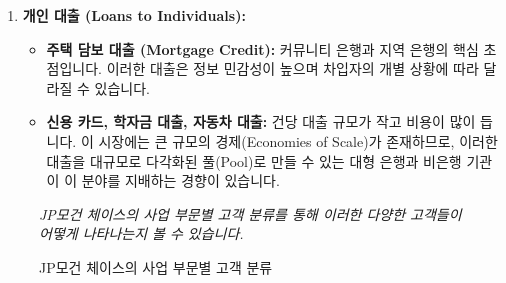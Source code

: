 \documentclass[11pt,a4paper]{article}
\theoremstyle{definition}
\begin{document}
\begin{enumerate}
    \item \textbf{개인 대출 (Loans to Individuals):}
    \begin{itemize}
        \item \textbf{주택 담보 대출 (Mortgage Credit):} 커뮤니티 은행과 지역 은행의 핵심 초점입니다. 이러한 대출은 정보 민감성이 높으며 차입자의 개별 상황에 따라 달라질 수 있습니다.
        \item \textbf{신용 카드, 학자금 대출, 자동차 대출:} 건당 대출 규모가 작고 비용이 많이 듭니다. 이 시장에는 큰 규모의 경제(Economies of Scale)가 존재하므로, 이러한 대출을 대규모로 다각화된 풀(Pool)로 만들 수 있는 대형 은행과 비은행 기관이 이 분야를 지배하는 경향이 있습니다.
    \end{itemize}
\end{enumerate}

\begin{figure}[h!]
    \centering
    \caption{JP모건 체이스의 사업 부문별 고객 분류}
    \label{fig:jpmorgan_segments}
    \textit{JP모건 체이스의 사업 부문별 고객 분류를 통해 이러한 다양한 고객들이 어떻게 나타나는지 볼 수 있습니다.}
\end{figure}
\end{document}
